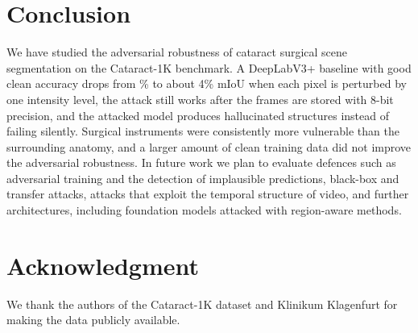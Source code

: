 \documentclass[conference]{IEEEtran}
\begin{document}
\section{Conclusion}
We have studied the adversarial robustness of cataract surgical scene segmentation on the Cataract-1K benchmark. A DeepLabV3+ baseline with good clean accuracy drops from \nCleanMIoU\% to about 4\% mIoU when each pixel is perturbed by one intensity level, the attack still works after the frames are stored with 8-bit precision, and the attacked model produces hallucinated structures instead of failing silently. Surgical instruments were consistently more vulnerable than the surrounding anatomy, and a larger amount of clean training data did not improve the adversarial robustness. In future work we plan to evaluate defences such as adversarial training and the detection of implausible predictions, black-box and transfer attacks, attacks that exploit the temporal structure of video, and further architectures, including foundation models attacked with region-aware methods.

\section*{Acknowledgment}
We thank the authors of the Cataract-1K dataset and Klinikum Klagenfurt for making the data publicly available.



\end{document}
